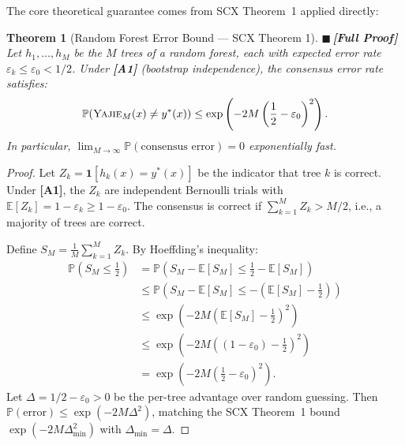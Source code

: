 \documentclass[12pt,a4paper]{article}
\newtheorem{theorem}{Theorem}[section]
\theoremstyle{definition}
\newcommand{\rigorFull}{{\color{rigorcolor}$\blacksquare$\,\textbf{[Full Proof]}}}
\newcommand{\Yajie}{\textsc{Yajie}}
\newcommand{\SCX}{\textsc{SCX}}
\newcommand{\E}{\mathbb{E}}
\newcommand{\Pbb}{\mathbb{P}}
\newcommand{\ind}[1]{\mathbf{1}[#1]}
\newcommand{\asmTag}[1]{\textsf{\textbf{[A#1]}}}
\begin{document}
The core theoretical guarantee comes from \SCX{} Theorem~1 applied directly:

\begin{theorem}[Random Forest Error Bound — SCX Theorem 1]\label{thm:rf_bound}
\rigorFull
Let $h_1, \ldots, h_M$ be the $M$ trees of a random forest, each with expected error rate $\varepsilon_k \le \varepsilon_0 < 1/2$. Under \asmTag{1} (bootstrap independence), the consensus error rate satisfies:
\begin{equation}\label{eq:rf_hoeffding}
    \Pbb(\Yajie_M(x) \neq y^*(x)) \le \exp\left(-2M\left(\frac{1}{2} - \varepsilon_0\right)^2\right).
\end{equation}
In particular, $\lim_{M \to \infty} \Pbb(\text{consensus error}) = 0$ exponentially fast.
\end{theorem}

\begin{proof}
Let $Z_k = \ind{h_k(x) = y^*(x)}$ be the indicator that tree $k$ is correct. Under \asmTag{1}, the $Z_k$ are independent Bernoulli trials with $\E[Z_k] = 1 - \varepsilon_k \ge 1 - \varepsilon_0$. The consensus is correct if $\sum_{k=1}^M Z_k > M/2$, i.e., a majority of trees are correct.

Define $S_M = \frac{1}{M}\sum_{k=1}^M Z_k$. By Hoeffding's inequality:
\begin{align}
    \Pbb\left(S_M \le \frac{1}{2}\right) &= \Pbb\left(S_M - \E[S_M] \le \frac{1}{2} - \E[S_M]\right) \\
    &\le \Pbb\left(S_M - \E[S_M] \le -\left(\E[S_M] - \frac{1}{2}\right)\right) \\
    &\le \exp\left(-2M\left(\E[S_M] - \frac{1}{2}\right)^2\right) \\
    &\le \exp\left(-2M\left((1-\varepsilon_0) - \frac{1}{2}\right)^2\right) \\
    &= \exp\left(-2M\left(\frac{1}{2} - \varepsilon_0\right)^2\right).
\end{align}
Let $\Delta = 1/2 - \varepsilon_0 > 0$ be the per-tree advantage over random guessing. Then $\Pbb(\text{error}) \le \exp(-2M\Delta^2)$, matching the \SCX{} Theorem~1 bound $\exp(-2M\Delta_{\min}^2)$ with $\Delta_{\min} = \Delta$.
\end{proof}
\end{document}
